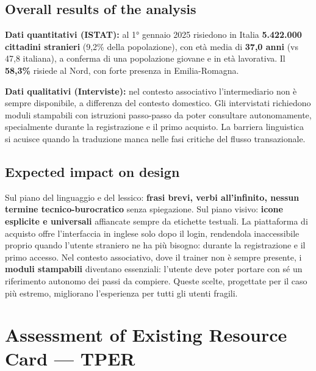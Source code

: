 ﻿\documentclass[11pt,a4paper]{article}
\begin{document}
\subsection*{Overall results of the analysis}
\begin{tcolorbox}[base]
\textbf{Dati quantitativi (ISTAT):} al 1° gennaio 2025 risiedono in
Italia \textbf{5.422.000 cittadini stranieri} (9,2\% della popolazione),
con età media di \textbf{37,0 anni} (vs 47,8 italiana), a conferma di
una popolazione giovane e in età lavorativa. Il \textbf{58,3\%} risiede
al Nord, con forte presenza in Emilia-Romagna.

\vspace{0.2cm}
\textbf{Dati qualitativi (Interviste):} nel contesto associativo
l'intermediario non è sempre disponibile, a differenza del contesto
domestico. Gli intervistati richiedono moduli stampabili con
istruzioni passo-passo da poter consultare autonomamente,
specialmente durante la registrazione e il primo acquisto. La
barriera linguistica si acuisce quando la traduzione manca nelle
fasi critiche del flusso transazionale.
\end{tcolorbox}
\subsection*{Expected impact on design}
\begin{tcolorbox}[base]
Sul piano del linguaggio e del lessico: \textbf{frasi brevi, verbi
all'infinito, nessun termine tecnico-burocratico} senza spiegazione.
Sul piano visivo: \textbf{icone esplicite e universali} affiancate
sempre da etichette testuali. La piattaforma di acquisto offre
l'interfaccia in inglese solo dopo il login, rendendola inaccessibile
proprio quando l'utente straniero ne ha più bisogno: durante la
registrazione e il primo accesso. Nel contesto associativo, dove il
trainer non è sempre presente, i \textbf{moduli stampabili} diventano
essenziali: l'utente deve poter portare con sé un riferimento
autonomo dei passi da compiere. Queste scelte, progettate per il caso
più estremo, migliorano l'esperienza per tutti gli utenti fragili.
\end{tcolorbox}

\newpage
{\raggedright\section{Assessment of Existing Resource Card --- TPER}\par}
\end{document}
